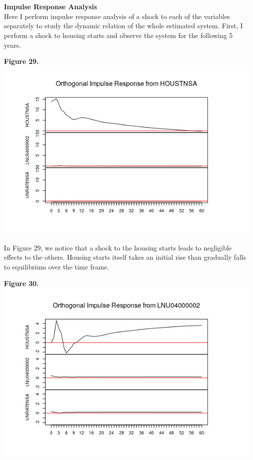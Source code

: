 \documentclass[11pt]{article}
\begin{document}
\\\\
\textbf{Impulse Response Analysis}
\\
Here I perform impulse response analysis of a shock to each of the variables separately to study the dynamic relation of the whole estimated system. First, I perform a shock to housing starts and observe the system for the following 5 years.
\begin{center}
\textbf{Figure 29.}
\\
\includegraphics[scale=1]{hsShock}
\end{center}
In Figure 29, we notice that a shock to the housing starts leads to negligible effects to the others. Housing starts itself takes an initial rise than gradually falls to equilibrium over the time frame.
\begin{center}
\textbf{Figure 30.}
\\
\includegraphics[scale=1]{uwShock}
\end{center}
\end{document}
